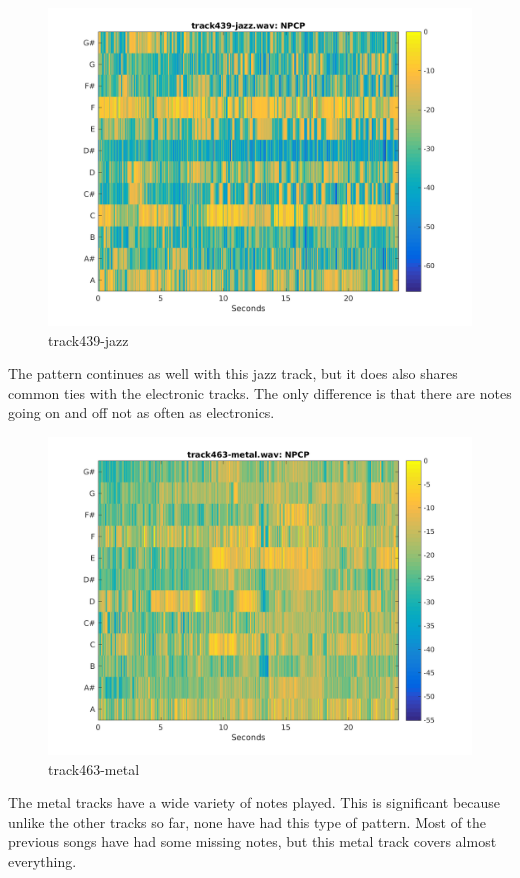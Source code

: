 \documentclass[11pt, a4paper]{article}
\begin{document}
\begin{figure}[H]
    \centering
    \includegraphics[width=.8\textwidth]{track439-jazz-NPCP.png}
    \caption{track439-jazz}
\end{figure}


The pattern continues as well with this jazz track, but it does also shares common ties with the electronic tracks. The only difference is that there are notes going on and off not as often as electronics.


\begin{figure}[H]
    \centering
    \includegraphics[width=.8\textwidth]{track463-metal-NPCP.png}
    \caption{track463-metal}
\end{figure} 


The metal tracks have a wide variety of notes played. This is significant because unlike the other tracks so far, none have had this type of pattern. Most of the previous songs have had some missing notes, but this metal track covers almost everything.
\end{document}
